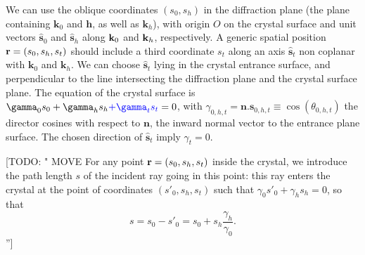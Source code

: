 \documentclass[preprint]{iucr}              %
\newcommand{\todo}[1]{{\color{red}[TODO: "#1'']}}
\newcommand{\inblue}[1]{{\color{blue}#1}}
\begin{document}
We can use the oblique coordinates $(s_0,s_h)$ in the diffraction plane (the plane containing $\textbf{k}_0$ and $\textbf{h}$, as well as $\textbf{k}_h$),
with origin $O$ on the crystal surface and unit vectors 
$\hat{ \textbf{s}}_{0}$ and $\hat{ \textbf{s}}_{h}$ along $\textbf k_0$ and $\textbf k_h$, respectively.
A generic spatial position  $\textbf r=(s_0,s_h,s_t)$ should include a third coordinate $s_t$ along an axis $\hat{\textbf{s}}_t$ non coplanar with $\textbf{k}_0$ and $\textbf{k}_h$.
We can choose $\hat{ \textbf{s}}_{t}$ lying in the crystal entrance surface, and perpendicular to the \inblue{line intersecting the diffraction plane and the crystal surface plane}.  
The equation of the crystal surface is $\gamma_0 s_0 + \gamma_h s_h \inblue{+ \gamma_t s_t}=0$, with $\gamma_{0,h,t}=\textbf{n}.\textbf{s}_{0,h,t} \equiv \cos(\theta_{0,h,t})$ the director cosines with respect to \inblue{$\textbf{n}$, the inward normal vector to the entrance plane surface}. The chosen direction of $\hat{ \textbf{s}}_{t}$ imply $\gamma_t=0$.

\todo{ MOVE For any point $\textbf r=(s_0,s_h,s_t)$ inside the crystal, we introduce the path length $s$ of the incident ray going in this point: this ray enters the crystal at the point of coordinates $(s'_0,s_h,s_t)$ such that $\gamma_0 s'_0+\gamma_h s_h = 0$, so that 
\begin{equation}
\label{eq:s}
s = s_0 - s'_0 = s_0 + s_h \frac{\gamma_h}{\gamma_0}.
\end{equation}
}
\end{document}
